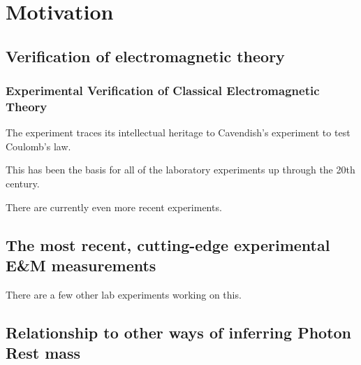 
\chapter{Motivation}
\section{Verification of electromagnetic theory}




\subsection{Experimental Verification of Classical Electromagnetic Theory}
The experiment traces its intellectual heritage to Cavendish's experiment to test Coulomb's law. 

This has been the basis for all of the laboratory experiments up through the 20th century. 

There are currently even more recent experiments.



\section{The most recent, cutting-edge experimental E\&M measurements}

There are a few other lab experiments working on this. 

\section{Relationship to other ways of inferring Photon Rest mass}



\section{}
